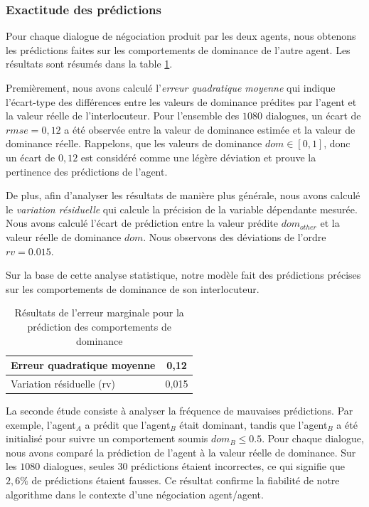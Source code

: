 	\subsubsection{Exactitude des prédictions}
	
	Pour chaque dialogue de négociation produit par les deux agents, nous obtenons les prédictions faites sur les comportements de dominance de l'autre agent. Les résultats sont résumés dans la table \ref{tab:res1}. 

	Premièrement, nous avons calculé l'\emph {erreur quadratique moyenne} qui indique l'écart-type des différences entre les valeurs de dominance prédites par l'agent et la valeur réelle de l'interlocuteur.
	Pour l'ensemble des $1080$ dialogues, un écart de $rmse = 0,12$ a été observée entre la valeur de dominance estimée et la valeur de dominance réelle. Rappelons, que les valeurs de dominance $dom \in [0,1]$, donc un écart de $0,12$ est considéré comme une légère déviation et prouve la pertinence des prédictions de l'agent. 
	
	 De plus, afin d'analyser les résultats de manière plus générale, nous avons calculé le \emph {variation résiduelle} qui calcule la précision de la variable dépendante mesurée. Nous avons calculé l'écart de prédiction entre la valeur prédite $ dom_{other} $ et la valeur réelle de dominance $dom$.
	Nous observons des déviations de l'ordre $ rv = 0.015 $.
	
	 Sur la base de cette analyse statistique, notre modèle fait des prédictions précises sur les comportements de dominance de son interlocuteur.
	
	
	\begin{table}[h]
		\centering
		\caption{Résultats de l'erreur marginale pour la prédiction des comportements de dominance} 
		\begin{tabular}{|l|c|}
			\hline
			Erreur quadratique moyenne & 0,12 \\
			\hline
			Variation résiduelle (rv) & 0,015 \\
			\hline
		\end{tabular}
		
		\label{tab:res1}
	\end{table}
	
	La seconde étude consiste à analyser la fréquence de mauvaises prédictions. 
	Par exemple, l'agent$_A$ a prédit que l'agent$_B$ était dominant, tandis que l'agent$_B$ a été initialisé pour suivre un comportement soumis $dom_B \leq 0.5$.  Pour chaque dialogue, nous avons comparé la prédiction de l'agent à la valeur réelle de dominance. Sur les $1080$ dialogues, seules $ 30 $ prédictions étaient incorrectes, ce qui signifie que $ 2,6 \% $ de prédictions étaient fausses. 
	Ce résultat confirme la fiabilité de notre algorithme dans le contexte d'une négociation agent/agent.
	
